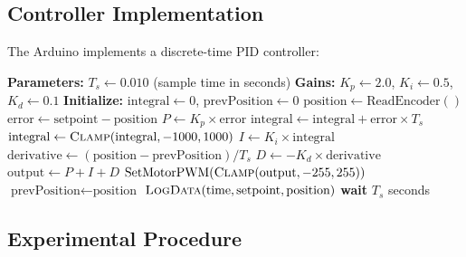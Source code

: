\subsection{Controller Implementation}

The Arduino implements a discrete-time PID controller:

\begin{algorithm}[H]
\caption{Discrete-Time PID Position Controller}
\begin{algorithmic}[1]
\State \textbf{Parameters:} $T_s \gets 0.010$ (sample time in seconds)
\State \textbf{Gains:} $K_p \gets 2.0$, $K_i \gets 0.5$, $K_d \gets 0.1$
\State \textbf{Initialize:} $\text{integral} \gets 0$, $\text{prevPosition} \gets 0$
\State
{}
    \State $\text{position} \gets \text{ReadEncoder}()$
    \State $\text{error} \gets \text{setpoint} - \text{position}$
    \State
    \State {}
    \State $P \gets K_p \times \text{error}$
    \State
    \State {}
    \State $\text{integral} \gets \text{integral} + \text{error} \times T_s$
    \State $\text{integral} \gets \Call{Clamp}{\text{integral}, -1000, 1000}$
    \State $I \gets K_i \times \text{integral}$
    \State
    \State {}
    \State $\text{derivative} \gets (\text{position} - \text{prevPosition}) / T_s$
    \State $D \gets -K_d \times \text{derivative}$
    \State
    \State {}
    \State $\text{output} \gets P + I + D$
    \State $\text{SetMotorPWM}(\Call{Clamp}{\text{output}, -255, 255})$
    \State
    \State {}
    \State $\text{prevPosition} \gets \text{position}$
    \State $\Call{LogData}{\text{time}, \text{setpoint}, \text{position}}$
    \State
    \State \textbf{wait} $T_s$ seconds
\EndWhile
\end{algorithmic}
\end{algorithm}

\subsection{Experimental Procedure}

